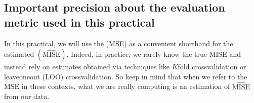 \documentclass[letterpaper,10pt,english]{jupyterBook}
\begin{document}
\subsection{Important precision about the evaluation metric used in this practical}
\label{\detokenize{03:important-precision-about-the-evaluation-metric-used-in-this-practical}}
\sphinxAtStartPar
In this practical, we will use the  (MSE) as a convenient shorthand for the estimated  \((\widehat{\mathrm{MISE}})\). Indeed, in practice, we rarely know the true MISE and instead rely on estimates obtained via techniques like \(K\)\sphinxhyphen{}fold cross\sphinxhyphen{}validation or leave\sphinxhyphen{}one\sphinxhyphen{}out (LOO) cross\sphinxhyphen{}validation. So keep in mind that when we refer to the MSE in these contexts, what we are really computing is an estimation of \(\widehat{\mathrm{MISE}}\) from our data.
\end{document}
